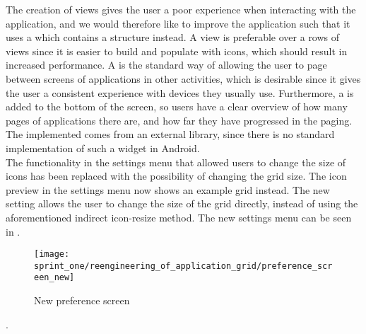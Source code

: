 The creation of  views gives the user a poor experience when interacting with the application, and we would therefore like to improve the \launcher application such that it uses a  which contains a  structure instead. A  view is preferable over a rows of  views since it is easier to build and populate with icons, which should result in increased performance. A  is the standard way of allowing the user to page between screens of applications in other \launcher activities, which is desirable since it gives the user a consistent experience with devices they usually use. Furthermore, a  is added to the bottom of the screen, so users have a clear overview of how many pages of applications there are, and how far they have progressed in the paging. The implemented  comes from an external library\parencite{view_pager_indicator_avianey}, since there is no standard implementation of such a widget in Android.\\

The functionality in the settings menu that allowed users to change the size of icons has been replaced with the possibility of changing the \launcher grid size. The icon preview in the settings menu now shows an example grid instead. The new setting allows the user to change the size of the grid directly, instead of using the aforementioned indirect icon-resize method. The new settings menu can be seen in .\\

\begin{figure}[!htbp]
    \centering
    \texttt{[image: sprint\_one/reengineering\_of\_application\_grid/preference\_screen\_new]}
    \caption{New preference screen}
    \label{fig:preference_screen_new}
\end{figure}.